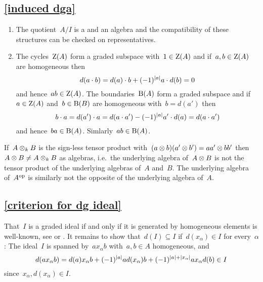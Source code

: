 




\subsection{\cref{induced dga}}
\label{induced dga proof}

\begin{enumerate}[start=3]
  \item
    The quotient~$A/I$ is a {\dgv} and an algebra and the compatibility of these structures can be checked on representatives.
  \item
    The cycles~$\operatorname{Z}(A)$ form a graded subspace with~$1 \in \operatorname{Z}(A)$ and if~$a, b \in \operatorname{Z}(A)$ are homogeneous then
    \[
      d(a \cdot b)
      =
      d(a) \cdot b
      +
      (-1)^{\lvert a\rvert} a \cdot d(b)
      =
      0
    \]
    and hence~$ab \in \operatorname{Z}(A)$.
    The boundaries~$\operatorname{B}(A)$ form a graded subspace and if~$a \in \operatorname{Z}(A)$ and~$b \in \operatorname{B}(B)$ are homogeneous with~$b = d(a')$ then
    \[
      b \cdot a
      =
      d(a') \cdot a
      =
      d(a \cdot a')
      -
      (-1)^{\lvert a\rvert} a' \cdot d(a)
      =
      d(a \cdot a')
    \]
    and hence~$ba \in \operatorname{B}(A)$.
    Simlarly~$ab \in \operatorname{B}(A)$.
  \leavevmode
\end{enumerate}

\begin{warning}
  If~$A \otimes_k B$ is the sign-less tensor product with~$(a \otimes b)(a' \otimes b') = a a' \otimes b b'$ then~$A \otimes B \neq A \otimes_k B$ as algebras, i.e.\ the underlying algebra of~$A \otimes B$ is not the tensor product of the underlying algebras of~$A$ and~$B$.
  The underlying algebra of~$A^{\mathrm{op}}$ is similarly not the opposite of the underlying algebra of~$A$.
\end{warning}





\subsection{\cref{criterion for dg ideal}}
\label{criterion for dg ideal proof}

That~$I$ is a graded ideal if and only if it is generated by homogeneous elements is  well-known, see \cite[IX, 2.5]{lang} or \cite[II.{\S}11.3]{bourbaki}.
It remains to show that~$d(I) \subseteq I$ if~$d(x_\alpha) \in I$ for every~$\alpha$:
The ideal~$I$ is spanned by~$a x_\alpha b$ with~$a, b \in A$ homogeneous, and
\[
  d(a x_\alpha b)
  =
    d(a) x_\alpha b
  + (-1)^{\lvert a\rvert} a d(x_\alpha) b
  + (-1)^{\lvert a\rvert + \lvert x_\alpha\rvert} a x_\alpha d(b)
  \in
  I
\]
since~$x_\alpha, d(x_\alpha) \in I$.





